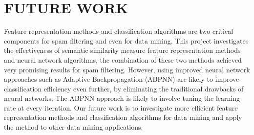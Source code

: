 \section{FUTURE WORK}
Feature representation methods and classification algorithms are two critical components for spam filtering and even for data mining. This project investigates the effectiveness of semantic similarity measure feature representation methods and neural network algorithms, the combination of these two methods achieved very promising results for spam filtering. However, using improved neural network approaches such as Adaptive Backpropagation (ABPNN) are likely to improve classification efficiency even further, by eliminating the traditional drawbacks of neural networks. The ABPNN approach is likely to involve tuning the learning rate at every iteration. Our future work is to investigate more efficient feature representation methods and classification algorithms for data mining and apply the method to other data mining applications.
